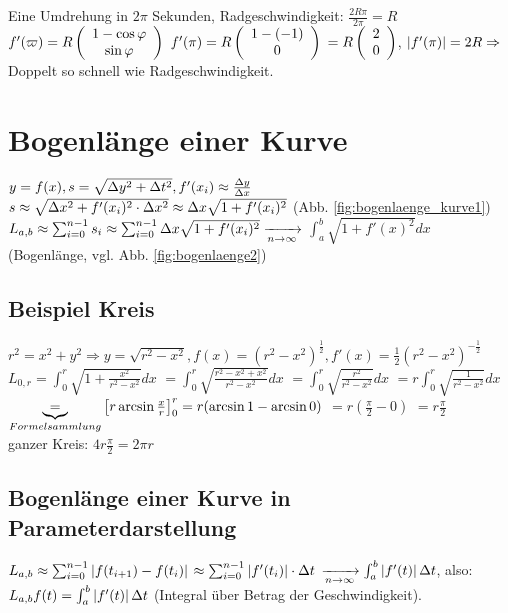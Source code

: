 Eine Umdrehung in $2\pi$ Sekunden, Radgeschwindigkeit: $\frac{2R\pi}{2\pi} =R$\\
$f'(\varpi) = R   \left(  \begin{array}{c} 1 - \cos \varphi\\\sin \varphi \end{array}  \right)  $
$f'(\pi)=R   \left(  \begin{array}{c} 1-(-1)\\0 \end{array}  \right)  $
$=R   \left(  \begin{array}{c} 2\\0 \end{array}  \right)  $, 
$ \left\vert f'(\pi) \right\vert  = 2R \Rightarrow$ Doppelt so schnell wie Radgeschwindigkeit. 

\section{Bogenlänge einer Kurve}
$ y=f(x), s=\sqrt{\Delta y^2 + \Delta t^2}, f'(x_i)\approx \frac{\Delta y}{\Delta x}$\\
$s\approx \sqrt{\Delta x^2 + f'(x_i)^2 \cdot \Delta x^2} \approx \Delta x \sqrt{1+f'(x_i)^2}$ (Abb. \ref{fig:bogenlaenge_kurve1})\\
$L_{a,b} \approx \sum_{i=0}^{n-1} s_i \approx \sum_{i=0}^{n-1} \Delta x \sqrt{1+f'(x_i)^2} \xrightarrow[n\rightarrow \infty]{} $
$\int_{a}^{b} \sqrt{1+f'(x)^2} dx $ (Bogenlänge, vgl. Abb. \ref{fig:bogenlaenge2}) 


\subsection{Beispiel Kreis}
$r^2 = x^2 + y^2 \Rightarrow y = \sqrt{r^2 - x^2}, f(x)= (r^2-x^2)^{\frac{1}{2}}, f'(x) = \frac{1}{2}(r^2 - x^2)^{-\frac{1}{2}}$
$L_{0,r} = \int_{0}^{r} \sqrt{1+\frac{x^2}{r^2 - x^2}} dx$
$= \int_{0}^{r} \sqrt{\frac{r^2 - x^2 + x^2}{r^2-x^2}} dx$
$= \int_{0}^{r} \sqrt{\frac{r^2}{r^2 - x^2}} dx$
$= r \int_{0}^{r} \sqrt{\frac{1}{r^2 - x^2}} dx$
$\underbrace{=}_{Formelsammlung}   \left[ r \arcsin \frac{x}{r} \right] _0^r = r(\arcsin 1 - \arcsin 0)$
$= r(\frac{\pi}{2} - 0)$
$= r \frac{\pi}{2}$\\
ganzer Kreis: $4r \frac{\pi}{2} = 2\pi r$

\subsection{Bogenlänge einer Kurve in Parameterdarstellung}
$L_{a,b} \approx \sum_{i=0}^{n-1}  \left\vert f(t_{i+1}) - f(t_i) \right\vert  $
$\approx \sum_{i=0}^{n-1}  \left\vert f'(t_i) \right\vert  \cdot \Delta t $
$\xrightarrow[n\rightarrow \infty]{} \int_{a}^{b}  \left\vert f'(t) \right\vert  \Delta t$, also: \\
$L_{a,b} f(t) = \int_{a}^{b}  \left\vert f'(t) \right\vert  \Delta t $ (Integral über Betrag der Geschwindigkeit).

